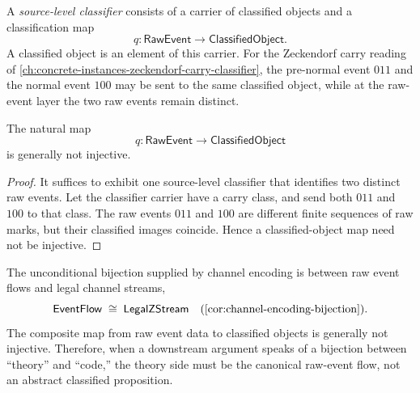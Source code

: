 \begin{definition}
\label{def:source-channel-classified-object}
A \emph{source-level classifier} consists of a carrier of classified objects and a classification map
$$
  q \colon \mathsf{RawEvent} \longrightarrow \mathsf{ClassifiedObject}.
$$
A classified object is an element of this carrier. For the Zeckendorf carry reading of \autoref{ch:concrete-instances-zeckendorf-carry-classifier}, the pre-normal event $011$ and the normal event $100$ may be sent to the same classified object, while at the raw-event layer the two raw events remain distinct.
\end{definition}

\begin{proposition}
\label{prop:source-channel-classified-not-injective}
The natural map
$$
  q \colon \mathsf{RawEvent} \longrightarrow \mathsf{ClassifiedObject}
$$
is generally not injective.
\end{proposition}

\begin{proof}
It suffices to exhibit one source-level classifier that identifies two distinct raw events. Let the classifier carrier have a carry class, and send both $011$ and $100$ to that class. The raw events $011$ and $100$ are different finite sequences of raw marks, but their classified images coincide. Hence a classified-object map need not be injective.
\end{proof}

\begin{corollary}
\label{cor:source-channel-bijection-only-at-raw-layer}
The unconditional bijection supplied by channel encoding is between raw event flows and legal channel streams,
$$
  \mathsf{EventFlow} \;\cong\; \mathsf{LegalZStream}
  \quad\text{(\autoref{cor:channel-encoding-bijection}).}
$$
The composite map from raw event data to classified objects is generally not injective. Therefore, when a downstream argument speaks of a bijection between ``theory'' and ``code,'' the theory side must be the canonical raw-event flow, not an abstract classified proposition.
\end{corollary}

